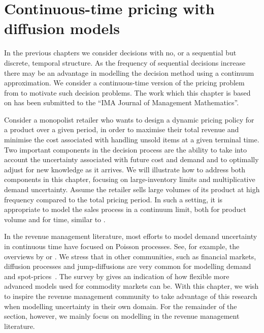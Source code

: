 \documentclass[main.tex]{subfiles}
\begin{document}
\chapter{Continuous-time pricing with diffusion
  models}\label{ch:cts_control}

In the previous chapters we consider decisions with no, or a
sequential but discrete, temporal structure.
As the frequency of sequential decisions increase there may be an
advantage in modelling the decision method using a continuum
approximation.
We consider a continuous-time version of the pricing problem from
 to motivate such decision problems.
The work which this chapter is based on has been submitted to
the ``IMA Journal of Management Mathematics''.

Consider a monopolist retailer who wants to design a dynamic pricing policy
for a product over a given period, in order to maximise their total
revenue and minimise the cost associated with handling unsold items
at a given terminal time.
Two important components in the decision process are the ability to
take into account the uncertainty associated with future cost and demand and to
optimally adjust for new knowledge as it arrives.
We will illustrate how to address both components in this chapter,
focusing on large-inventory limits and multiplicative demand
uncertainty.
Assume the retailer sells large volumes of its product at
high frequency compared to the total pricing period. In such a setting, it is
appropriate to model the sales process in a continuum limit, both for
product volume and for time, similar to \citet{kalish1983monopolist}.

In the revenue management literature, most efforts to model demand uncertainty in
continuous time have focused on Poisson
processes. See, for example, the overviews by \citet{bitran2003overview}
or \citet{aviv2012dynamic}.
We stress that in other communities, such as financial markets,
diffusion processes and jump-diffusions are very common for modelling
demand and spot-prices~\citep{benth2014stochastic}. The survey by \citet{carmona2014survey}
gives an indication of how flexible more advanced models used for commodity
markets can be. With this chapter, we wish to inspire the revenue
management community to take advantage of this research when modelling
uncertainty in their own domain. For the remainder of the section,
however, we mainly focus on modelling in the revenue management literature.
\end{document}
